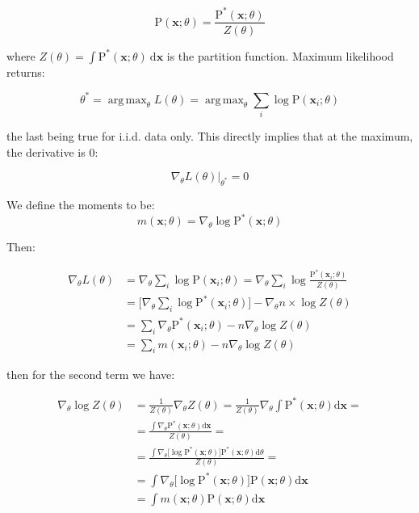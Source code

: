\documentclass{article}
\newcommand{\prob}{\text{P}}
\renewcommand{\vec}[1]{\mathbf{#1}}
\newcommand{\bx}{\vec{x}}
\DeclareMathOperator*{\argmax}{arg\,max}
\begin{document}
\begin{equation*}
    \prob(\bx; \theta) = \frac{
        \prob^*(\bx; \theta)
    } {
        Z(\theta)
    }
\end{equation*}

where $Z(\theta) = \int \prob^*(\bx; \theta)\ \text{d}\bx$ is the partition function. Maximum likelihood returns:

\begin{equation*}
    \theta^* = \argmax_\theta L(\theta) = 
        \argmax_\theta \sum_i \log \prob(\bx_i; \theta)
\end{equation*}

the last being true for i.i.d. data only. This directly implies that at the maximum, the derivative is $0$:

\begin{equation*}
    \nabla_\theta L(\theta) \vert_{\theta^*} = 0
\end{equation*}

We define the moments to be:
\begin{equation*}
    m(\bx; \theta) = \nabla_\theta \log \prob^*(\bx; \theta)
\end{equation*}

Then:

\begin{align*}
    \nabla_\theta L(\theta) &= \nabla_\theta \sum_i \log \prob(\bx_i; \theta) = \nabla_\theta \sum_i \log \frac{\prob^*(\bx_i; \theta)}{Z(\theta)} \\
    &= \bigg[\nabla_\theta \sum_i \log\prob^*(\bx_i; \theta) \bigg] - \nabla_\theta n \times \log Z(\theta) \\
    &= \sum_i \nabla_\theta \prob^*(\bx_i; \theta) - n \nabla_\theta \log Z(\theta) \\
    &= \sum_i m(\bx_i; \theta) - n \nabla_\theta \log Z(\theta)
\end{align*}

then for the second term we have:

\begin{align*}
    \nabla_\theta \log Z(\theta) &= \frac{1}{Z(\theta)} \nabla_\theta Z(\theta) = \frac{1}{Z(\theta)} \nabla_\theta \int \prob^*(\bx; \theta) \text{d} \bx = \\
    &= \frac{
        \int \nabla_\theta \prob^*(\bx; \theta) \text{d} \bx
    } {
        Z(\theta)
    } = \\
    &= \frac{
        \int \nabla_\theta \big[ \log \prob^*(\bx; \theta) \big] \prob^*(\bx; \theta) \text{d}\theta
    } {
        Z(\theta)
    } = \\
    &= \int \nabla_\theta \big[ \log \prob^*({\bx; \theta}) \big] \prob(\bx; \theta) \text{d}\bx \\
    &= \int m(\bx; \theta) \prob(\bx; \theta) \text{d}\bx
\end{align*}
\end{document}
